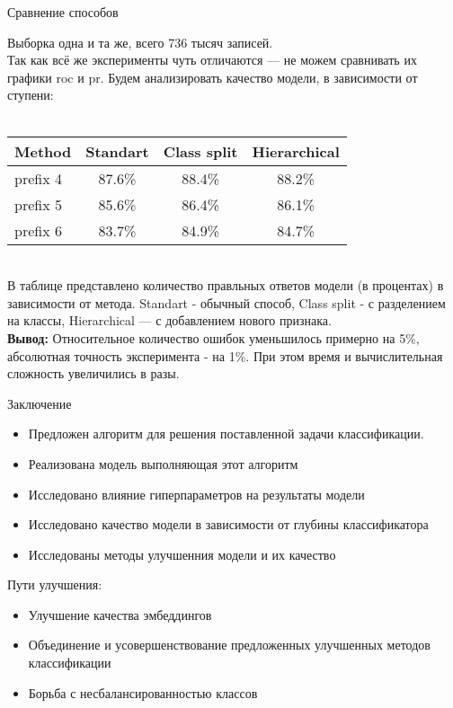 \documentclass{beamer}
\begin{document}
\begin{frame}{Сравнение способов}

Выборка одна и та же, всего 736 тысяч записей.\\
Так как всё же эксперименты чуть отличаются --- не можем сравнивать их графики roc и pr. Будем анализировать качество модели, в зависимости от ступени: \\
\bigskip \\

\begin{tabular}{|l|c|c|c|}

\hline

\textbf{Method} & \textbf{Standart} & \textbf{Class split} & \textbf{Hierarchical} \\ \hline
prefix 4 & 87.6\% & 88.4\% & 88.2\% \\ \hline
prefix 5 & 85.6\% & 86.4\% & 86.1\% \\ \hline
prefix 6 & 83.7\% & 84.9\% & 84.7\% \\ \hline
\end{tabular}

\bigskip  \\
В таблице представлено количество правльных ответов модели (в процентах) в зависимости от метода. Standart - обычный способ, Class split - с разделением на классы, Hierarchical --- с добавлением нового признака.\\
\textbf{Вывод:} Относительное количество ошибок уменьшилось примерно на 5\%, абсолютная точность эксперимента - на 1\%. При этом время и вычислительная сложность увеличились в разы.

\end{frame}
\begin{frame}{Заключение}
    
    \begin{itemize}
        \item Предложен алгоритм для решения поставленной задачи классификации.
        \item Реализована модель выполняющая этот алгоритм
        \item Исследовано влияние гиперпараметров на результаты модели 
        \item Исследовано качество модели в зависимости от глубины классификатора
        \item Исследованы методы улучшенния модели и их качество
    \end{itemize}

    Пути улучшения:
    \begin{itemize}
        \item Улучшение качества эмбеддингов
        \item Объединение и усовершенствование предложенных улучшенных методов классификации
        \item Борьба с несбалансированностью классов
    \end{itemize}
    
\end{frame}
\end{document}

